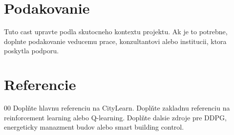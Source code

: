 \documentclass[conference]{IEEEtran}
\begin{document}
\section*{Podakovanie}
Tuto cast upravte podla skutocneho kontextu projektu. Ak je to potrebne, doplnte podakovanie veducemu prace, konzultantovi alebo institucii, ktora poskytla podporu.

\section*{Referencie}

\begin{thebibliography}{00}
 Doplňte hlavnu referenciu na CityLearn.
 Doplňte zakladnu referenciu na reinforcement learning alebo Q-learning.
 Doplňte dalsie zdroje pre DDPG, energeticky manazment budov alebo smart building control.
\end{thebibliography}
\end{document}
